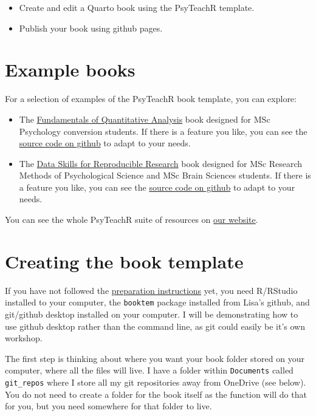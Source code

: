 \documentclass[
  letterpaper,
  DIV=11,
  numbers=noendperiod]{scrreprt}
\begin{document}
\begin{itemize}
\item
  Create and edit a Quarto book using the PsyTeachR template.
\item
  Publish your book using github pages.
\end{itemize}

\section{Example books}\label{example-books}

For a selection of examples of the PsyTeachR book template, you can
explore:

\begin{itemize}
\item
  The \href{https://psyteachr.github.io/quant-fun-v3/}{Fundamentals of
  Quantitative Analysis} book designed for MSc Psychology conversion
  students. If there is a feature you like, you can see the
  \href{https://github.com/PsyTeachR/quant-fun-v3}{source code on
  github} to adapt to your needs.
\item
  The \href{https://psyteachr.github.io/reprores-v4/}{Data Skills for
  Reproducible Research} book designed for MSc Research Methods of
  Psychological Science and MSc Brain Sciences students. If there is a
  feature you like, you can see the
  \href{https://github.com/PsyTeachR/reprores-v4}{source code on github}
  to adapt to your needs.
\end{itemize}

You can see the whole PsyTeachR suite of resources on
\href{https://psyteachr.github.io/}{our website}.

\section{Creating the book template}\label{creating-the-book-template}

If you have not followed the \hyperref[workshop_prep]{preparation
instructions} yet, you need R/RStudio installed to your computer, the
\texttt{booktem} package installed from Lisa's github, and git/github
desktop installed on your computer. I will be demonstrating how to use
github desktop rather than the command line, as git could easily be it's
own workshop.

The first step is thinking about where you want your book folder stored
on your computer, where all the files will live. I have a folder within
\texttt{Documents} called \texttt{git\_repos} where I store all my git
repositories away from OneDrive (see below). You do not need to create a
folder for the book itself as the function will do that for you, but you
need somewhere for that folder to live.
\end{document}
